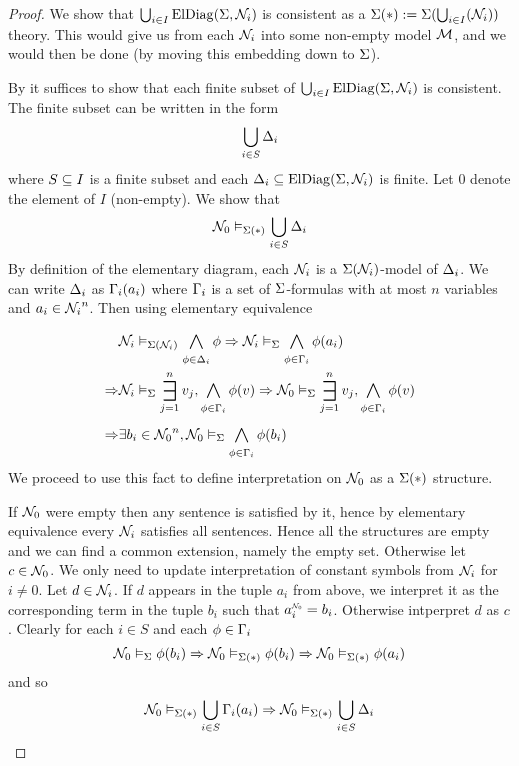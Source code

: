\begin{proof}
    We show that 
    $\bigcup_{i \in I} \mathrm{ElDiag}(\Sigma,\mathcal{N}_i)$ is consistent
    as a $\Sigma(*):=\Sigma(\bigcup_{i \in I} ({\mathcal{N}_i}))$ theory.
    This would give us 
    from each $\mathcal{N}_i$ into some non-empty model $\mathcal{M}$,
    and we would then be done (by moving this embedding down to $\Sigma$).

    By  it suffices to show that 
    each finite subset of $\bigcup_{i \in I} \mathrm{ElDiag}(\Sigma,\mathcal{N}_i)$ is consistent.
    The finite subset can be written in the form
    \[\bigcup_{i \in S} \Delta_i\]
    where $S \subseteq I$ is a finite subset 
    and each $\Delta_i \subseteq \mathrm{ElDiag}(\Sigma,\mathcal{N}_i)$ is finite.
    Let $0$ denote the element of $I$ (non-empty). 
    We show that 
    \[\mathcal{N}_0 \vDash_{\Sigma(*)} \bigcup_{i \in S} \Delta_i\]
    By definition of the elementary diagram,
    each $\mathcal{N}_i$ is a $\Sigma(\mathcal{N}_i)$-model of $\Delta_i$. 
    We can write $\Delta_i$ as $\Gamma_i(a_i)$ 
    where $\Gamma_i$ is a set of $\Sigma$-formulas
    with at most $n$ variables and $a_i \in {\mathcal{N}_i}^n$.
    Then using elementary equivalence
    \begin{align*}
        &\NN_i \model{\Si(\NN_i)} \bigand{\phi \in \De_i}{} \phi
        \implies \NN_i \model{\Si} \bigand{\phi \in \Ga_i}{} \phi(a_i)\\
        \implies &\NN_i \model{\Si} \bigexists{j = 1}{n} v_j, 
        \bigand{\phi \in \Ga_i}{} \phi(v)
        \implies \NN_0 \model{\Si} \bigexists{j = 1}{n} v_j, 
        \bigand{\phi \in \Ga_i}{} \phi(v)\\
        \implies &\exists b_i \in {\NN_0}^n, \NN_0 \model{\Si} 
        \bigand{\phi \in \Ga_i}{} \phi(b_i)
    \end{align*}
    We proceed to use this fact to define interpretation on $\mathcal{N}_0$ as 
    a $\Sigma(*)$ structure.

    If $\mathcal{N}_0$ were empty then any sentence is satisfied by it, 
    hence by elementary equivalence every $\mathcal{N}_i$ satisfies all sentences.
    Hence all the structures are empty and we can find a common extension,
    namely the empty set.
    Otherwise let $c \in {\mathcal{N}_0}$.
    We only need to update interpretation of constant symbols from 
    ${\mathcal{N}_i}$ for $i \ne 0$.
    Let $d \in {\mathcal{N}_i}$.
    If $d$ appears in the tuple $a_i$ from above, 
    we interpret it as the corresponding term in the tuple $b_i$ such that 
    $\modintp{\NN_0}{a_i} = b_i$.
    Otherwise intperpret $d$ as $c$.
    Clearly for each $i \in S$ and each $\phi \in \Gamma_i$
    \[\mathcal{N}_0 \vDash_{\Sigma} \phi(b_i) \Rightarrow 
    \mathcal{N}_0 \vDash_{\Sigma(*)} \phi(b_i) \Rightarrow 
    \mathcal{N}_0 \vDash_{\Sigma(*)} \phi(a_i)\]
    and so 
    \[\mathcal{N}_0 \vDash_{\Sigma(*)} \bigcup_{i \in S} \Gamma_i(a_i)
    \Rightarrow \mathcal{N}_0 \vDash_{\Sigma(*)} \bigcup_{i \in S} \Delta_i\]
\end{proof}

